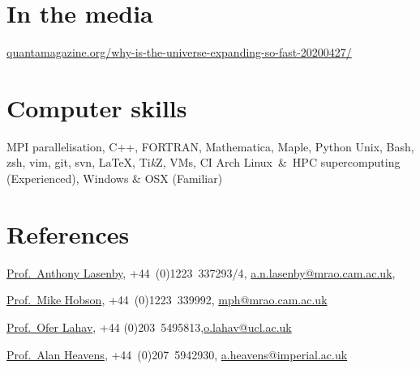 \documentclass[11pt,a4paper,sans]{moderncv}
\begin{document}
\section{In the media}
{\href{https://www.quantamagazine.org/why-is-the-universe-expanding-so-fast-20200427/}{quantamagazine.org/why-is-the-universe-expanding-so-fast-20200427/}}

\section{Computer skills}
 {MPI parallelisation, C++, FORTRAN, Mathematica, Maple, Python}
   {Unix, Bash, zsh, vim, git, svn, \LaTeX, Ti\textit{k}Z, VMs, CI}
          {Arch Linux~\&~HPC supercomputing (Experienced), Windows \& OSX (Familiar)}


\section{References}
\href{https://www.kicc.cam.ac.uk/directory/anl1000}{Prof.\ Anthony Lasenby}, {+44~(0)1223~337293/4}, \href{mailto:a.n.lasenby@mrao.cam.ac.uk}{a.n.lasenby@mrao.cam.ac.uk}, 

\href{https://www.phy.cam.ac.uk/directory/hobsonm}{Prof.\ Mike Hobson}, {+44~(0)1223~339992}, \href{mailto:mph@mrao.cam.ac.uk}{mph@mrao.cam.ac.uk} 

\href{https://www.ucl.ac.uk/astrophysics/professor-ofer-lahav}{Prof.\ Ofer Lahav}, {+44 (0)203~5495813},\href{mailto:o.lahav@ucl.ac.uk}{o.lahav@ucl.ac.uk} 

\href{https://www.imperial.ac.uk/people/a.heavens}{Prof.\ Alan Heavens}, {+44~(0)207~5942930}, \href{mailto:a.heavens@imperial.ac.uk}{a.heavens@imperial.ac.uk} 
\end{document}

